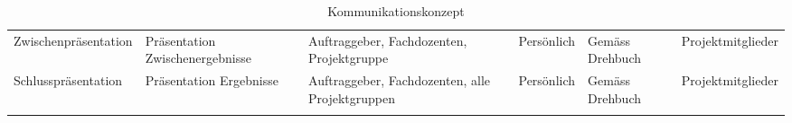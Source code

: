 \begin{table}[!h]
\begin{longtable}{p{3.5cm}p{3.5cm}p{3.5cm}p{3.5cm}p{3.5cm}p{4cm}}
    Zwischenpr\"asentation
    & Pr\"asentation Zwischenergebnisse
    & Auftraggeber, Fachdozenten, Projektgruppe
    & Pers\"onlich
    & Gem\"ass Drehbuch
    & Projektmitglieder \\
    [2mm]

    Schlusspr\"asentation
    & Pr\"asentation Ergebnisse
    & Auftraggeber, Fachdozenten, alle Projektgruppen
    & Pers\"onlich
    & Gem\"ass Drehbuch
    & Projektmitglieder \\

    \bottomrule
    \caption{Kommunikationskonzept}
    \label{tab:kommunikationskonzept}
    \end{longtable}
\end{table}

